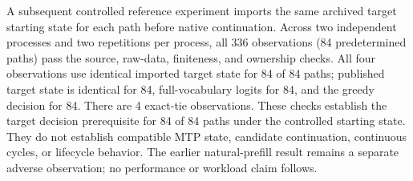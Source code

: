 A subsequent controlled reference experiment imports the same archived target
starting state for each path before native continuation. Across two independent
processes and two repetitions per process, all 336 observations (84 predetermined
paths) pass the source, raw-data, finiteness, and ownership checks.
All four observations use identical imported target state for
84 of 84 paths; published target state is identical for
84, full-vocabulary logits for 84,
and the greedy decision for 84. There are
4 exact-tie observations.
These checks establish the target decision prerequisite for
84 of 84 paths under the controlled starting state.
They do not establish compatible MTP state, candidate continuation, continuous
cycles, or lifecycle behavior. The earlier natural-prefill result remains a
separate adverse observation; no performance or workload claim follows.
